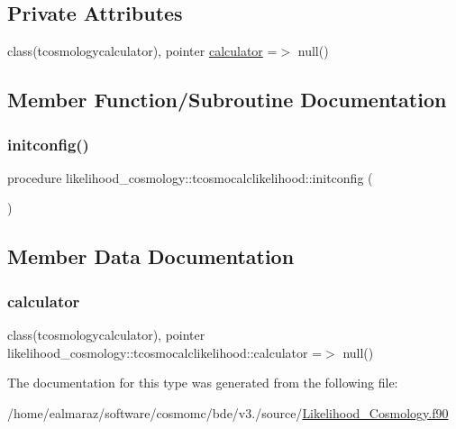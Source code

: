 \subsection*{Private Attributes}
\begin{DoxyCompactItemize}
\item 
class(tcosmologycalculator), pointer \mbox{\hyperlink{structlikelihood__cosmology_1_1tcosmocalclikelihood_a98fd0186c433cf3491b38f81bc67ab29}{calculator}} =$>$ null()
\end{DoxyCompactItemize}


\subsection{Member Function/\+Subroutine Documentation}
\mbox{\label{structlikelihood__cosmology_1_1tcosmocalclikelihood_a33eb387999b26a6b0adbb8da886d050e}} 
\subsubsection{\texorpdfstring{initconfig()}{initconfig()}}
{\footnotesize\ttfamily procedure likelihood\+\_\+cosmology\+::tcosmocalclikelihood\+::initconfig (\begin{DoxyParamCaption}{ }\end{DoxyParamCaption})\hspace{0.3cm}{\ttfamily [private]}}



\subsection{Member Data Documentation}
\mbox{\label{structlikelihood__cosmology_1_1tcosmocalclikelihood_a98fd0186c433cf3491b38f81bc67ab29}} 
\subsubsection{\texorpdfstring{calculator}{calculator}}
{\footnotesize\ttfamily class(tcosmologycalculator), pointer likelihood\+\_\+cosmology\+::tcosmocalclikelihood\+::calculator =$>$ null()\hspace{0.3cm}{\ttfamily [private]}}



The documentation for this type was generated from the following file\+:\begin{DoxyCompactItemize}
\item 
/home/ealmaraz/software/cosmomc/bde/v3./source/\mbox{\hyperlink{Likelihood__Cosmology_8f90}{Likelihood\+\_\+\+Cosmology.\+f90}}\end{DoxyCompactItemize}
